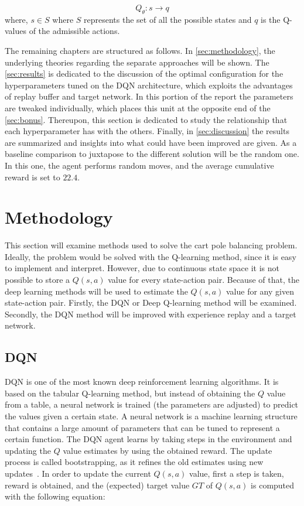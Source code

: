 \documentclass{article}
\begin{document}
\begin{equation}
    Q_{\theta} :  s \rightarrow q
    \label{eq:value-based-approach}
\end{equation}
where, $s \in S$ where $S$ represents the set of all the possible states and $q$ is the Q-values of the admissible actions.


The remaining chapters are structured as follows.
In \autoref{sec:methodology}, the underlying theories regarding the separate approaches will be shown.
The \autoref{sec:results} is dedicated to the discussion of the optimal configuration for the hyperparameters tuned on the DQN architecture, which exploits the advantages of replay buffer and target network.
In this portion of the report the parameters are tweaked individually, which places this unit at the opposite end of the \autoref{sec:bonus}.
Thereupon, this section is dedicated to study the relationship that each hyperparameter has with the others.
Finally, in \autoref{sec:discussion} the results are summarized and insights into what could have been improved are given.
As a baseline comparison to juxtapose to the different solution will be the random one.
In this one, the agent performs random moves, and the average cumulative reward is set to $22.4$.

\section{Methodology}
\label{sec:methodology}
This section will examine methods used to solve the cart pole balancing problem.
Ideally, the problem would be solved with the Q-learning method, since it is easy to implement and interpret.
However, due to continuous state space it is not possible to store a $Q(s,a)$ value for every state-action pair.
Because of that, the deep learning methods will be used to estimate the $Q(s,a)$ value for any given state-action pair.
Firstly, the DQN or Deep Q-learning method will be examined.
Secondly, the DQN method will be improved with experience replay and a target network.

\subsection{DQN}
\label{subsec:dqn}
DQN is one of the most known deep reinforcement learning algorithms.
It is based on the tabular Q-learning method, but instead of obtaining the $Q$ value from a table,
a neural network is trained (the parameters are adjusted) to predict the values given a certain state.
A neural network is a machine learning structure that contains a large amount of parameters that can be tuned
to represent a certain function.
The DQN agent learns by taking steps in the environment and updating the $Q$ value estimates by using the obtained reward.
The update process is called bootstrapping, as it refines the old estimates using new updates~\cite{DBLP:books/sp/Plaat22}.
In order to update the current $Q(s,a)$ value, first a step is taken, reward is obtained, and the (expected)
target value $GT$ of $Q(s,a)$ is computed with the following equation:
\end{document}
